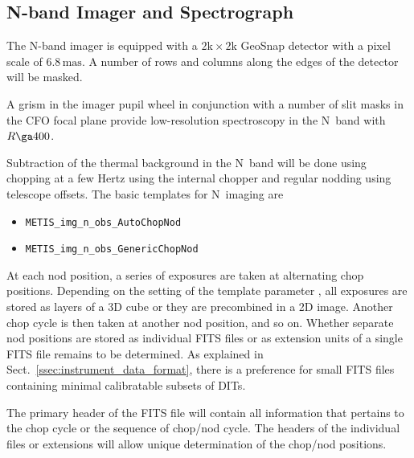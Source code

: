 \subsection{N-band Imager and Spectrograph}
\label{ssec:instrument_data_N-IMG}

The N-band imager is equipped with a $2\mathrm{k}\times 2\mathrm{k}$
GeoSnap detector with a pixel scale of $6.8\,\mathrm{mas}$. A number
of rows and columns along the edges of the detector will be masked.

A grism in the imager pupil wheel in conjunction with a number of slit
masks in the CFO focal plane provide low-resolution spectroscopy in
the N~band with $R\ga 400$.

Subtraction of the thermal background in the N~band will be done using
chopping at a few Hertz using the internal chopper and regular nodding
using telescope offsets. The basic templates for N~imaging are
\begin{itemize}
\item \lstinline{METIS_img_n_obs_AutoChopNod}
\item \lstinline{METIS_img_n_obs_GenericChopNod}
\end{itemize}

At each nod position, a series of exposures are taken at alternating
chop positions. Depending on the setting of the template parameter
, all exposures are stored as layers of a 3D cube
or they are precombined in a 2D image. Another chop cycle is then
taken at another nod position, and so on. Whether separate nod
positions are stored as individual FITS files or as extension units of
a single FITS file remains to be determined. As explained in
Sect.~\ref{ssec:instrument_data_format}, there is a preference for
small FITS files containing minimal calibratable subsets of DITs.

The primary header of the FITS file will contain all information that
pertains to the chop cycle or the sequence of chop/nod cycle. The
headers of the individual files or extensions will allow unique
determination of the chop/nod positions.

